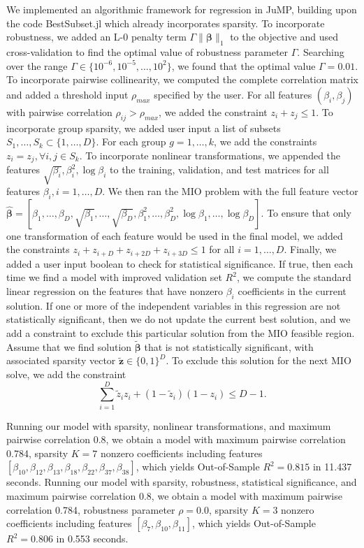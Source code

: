 \documentclass[12pt]{article}
\newcommand{\M}{\mathbf}
\newcommand{\MS}{\boldsymbol}
\newcommand{\1}{\mathds{1}}
\begin{document}
We implemented an algorithmic framework for regression in JuMP, building upon the code BestSubset.jl which already incorporates sparsity.  To incorporate robustness, we added an L-0 penalty term $\Gamma \|\MS \beta\|_1$ to the objective and used cross-validation to find the optimal value of robustness parameter $\Gamma$. Searching over the range $\Gamma \in \{10^{-6},10^{-5},\ldots,10^2\}$, we found that the optimal value $\Gamma = 0.01$.  To incorporate pairwise collinearity, we computed the complete correlation matrix and added a threshold input $\rho_{max}$ specified by the user.  For all features $(\beta_i, \beta_j)$ with pairwise correlation $\rho_{ij} > \rho_{max}$, we added the constraint $z_i + z_j \le 1$.  To incorporate group sparsity, we added user input a list of subsets $S_1,\ldots, S_k \subset \{1,\ldots, D\}$.  For each group $g = 1,\ldots,k$, we add the constraints $z_i = z_j, \forall i,j \in S_k$.  To incorporate nonlinear transformations, we appended the features $\sqrt{\beta_i}, \beta_i^2, \log \beta_i$ to the training, validation, and test matrices for all features $\beta_i, i=1,\ldots,D$.  We then ran the MIO problem with the full feature vector $\hat{\MS \beta} = [\beta_1,\ldots, \beta_D, \sqrt{\beta_1}, \ldots, \sqrt{\beta_D}, \beta_1^2, \ldots, \beta_D^2, \log \beta_1, \ldots, \log \beta_D]$.   To ensure that only one transformation of each feature would be used in the final model, we added the constraints $z_i + z_{i+D} + z_{i+2D} + z_{i+3D} \le 1$ for all $i = 1,\ldots,D$.    Finally, we added a user input boolean to check for statistical significance.  If true, then each time we find a model with improved validation set $R^2$, we compute the standard linear regression on the features that have nonzero $\beta_i$ coefficients in the current solution.  If one or more of the independent variables in this regression are not statistically significant, then we do not update the current best solution, and we add a constraint to exclude this particular solution from the MIO feasible region.  Assume that we find solution $\MS {\tilde \beta}$ that is not statistically significant, with associated sparsity vector $\M {\tilde z} \in \{0,1\}^D$.  To exclude this solution for the next MIO solve, we add the constraint
\[
\sum_{i=1}^D {\tilde z_i} z_i + (1 - {\tilde z_i})(1 - z_i) \le D - 1.
\]

Running our model with sparsity, nonlinear transformations, and maximum pairwise correlation 0.8, we obtain a model with maximum pairwise correlation 0.784, sparsity $K = 7$ nonzero coefficients including features $[\beta_{10}, \beta_{12}, \beta_{13}, \beta_{18}, \beta_{22}, \beta_{37}, \beta_{38}]$, which yields Out-of-Sample $R^2 = 0.815$ in 11.437 seconds.  Running our model with sparsity, robustness, statistical significance, and maximum pairwise correlation 0.8, we obtain a model with maximum pairwise correlation 0.784, robustness parameter $\rho = 0.0$, sparsity $K = 3$ nonzero coefficients including features $[\beta_{7}, \beta_{10}, \beta_{11}]$, which yields Out-of-Sample $R^2 = 0.806$ in 0.553 seconds.
\end{document}
